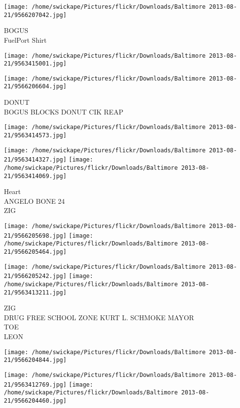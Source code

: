 \documentclass[10pt,letterpaper]{article}
\begin{document}
\vspace{0.25in}
\texttt{[image: /home/swickape/Pictures/flickr/Downloads/Baltimore 2013-08-21/9566207042.jpg]}

BOGUS\\
FuelPort Shirt\\
\pagebreak

\texttt{[image: /home/swickape/Pictures/flickr/Downloads/Baltimore 2013-08-21/9563415001.jpg]}

\vspace{0.25in}
\texttt{[image: /home/swickape/Pictures/flickr/Downloads/Baltimore 2013-08-21/9566206604.jpg]}

DONUT\\
BOGUS BLOCKS DONUT CIK REAP\\
\pagebreak

\texttt{[image: /home/swickape/Pictures/flickr/Downloads/Baltimore 2013-08-21/9563414573.jpg]}

\vspace{0.25in}
\texttt{[image: /home/swickape/Pictures/flickr/Downloads/Baltimore 2013-08-21/9563414327.jpg]}
\texttt{[image: /home/swickape/Pictures/flickr/Downloads/Baltimore 2013-08-21/9563414069.jpg]}

Heart\\
ANGELO BONE 24\\
ZIG\\
\pagebreak

\texttt{[image: /home/swickape/Pictures/flickr/Downloads/Baltimore 2013-08-21/9566205698.jpg]}
\texttt{[image: /home/swickape/Pictures/flickr/Downloads/Baltimore 2013-08-21/9566205464.jpg]}

\texttt{[image: /home/swickape/Pictures/flickr/Downloads/Baltimore 2013-08-21/9566205242.jpg]}
\texttt{[image: /home/swickape/Pictures/flickr/Downloads/Baltimore 2013-08-21/9563413211.jpg]}

ZIG\\
DRUG FREE SCHOOL ZONE KURT L. SCHMOKE MAYOR\\
TOE\\
LEON\\
\pagebreak

\texttt{[image: /home/swickape/Pictures/flickr/Downloads/Baltimore 2013-08-21/9566204844.jpg]}

\vspace{0.25in}
\texttt{[image: /home/swickape/Pictures/flickr/Downloads/Baltimore 2013-08-21/9563412769.jpg]}
\texttt{[image: /home/swickape/Pictures/flickr/Downloads/Baltimore 2013-08-21/9566204460.jpg]}
\end{document}

